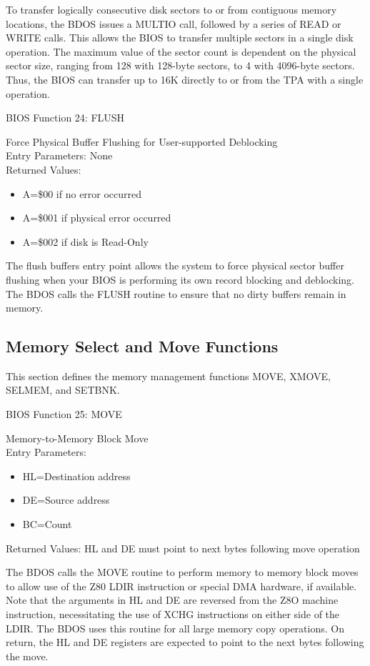 To transfer logically consecutive disk sectors to or from contiguous
memory locations, the BDOS issues a MULTIO call, followed by a series
of READ or WRITE calls. This allows the BIOS to transfer multiple
sectors in a single disk operation. The maximum value of the sector
count is dependent on the physical sector size, ranging from 128 with
128-byte sectors, to 4 with 4096-byte sectors. Thus, the BIOS can
transfer up to 16K directly to or from the TPA with a single
operation.

BIOS Function 24: FLUSH

Force Physical Buffer Flushing for User-supported Deblocking\\
Entry Parameters: None\\
Returned Values:
\begin{itemize}
\item[] A=\$00 if no error occurred
\item[] A=\$001 if physical error occurred
\item[] A=\$002 if disk is Read-Only
\end{itemize}

The flush buffers entry point allows the system to force physical
sector buffer flushing when your BIOS is performing its own record
blocking and deblocking.  The BDOS calls the FLUSH routine to ensure
that no dirty buffers remain in memory.

\subsection{Memory Select and Move Functions}
This section defines the memory management functions MOVE, XMOVE,
SELMEM, and SETBNK.

BIOS Function 25: MOVE

Memory-to-Memory Block Move\\
Entry Parameters:
\begin{itemize}
\item[] HL=Destination address
\item[] DE=Source address
\item[] BC=Count
\end{itemize}
Returned Values: HL and DE must point to next bytes following move
operation

The BDOS calls the MOVE routine to perform memory to memory block
moves to allow use of the Z80 LDIR instruction or special DMA
hardware, if available. Note that the arguments in HL and DE are
reversed from the Z8O machine instruction, necessitating the use of
XCHG instructions on either side of the LDIR. The BDOS uses this
routine for all large memory copy operations. On return, the HL and DE
registers are expected to point to the next bytes following the move.

